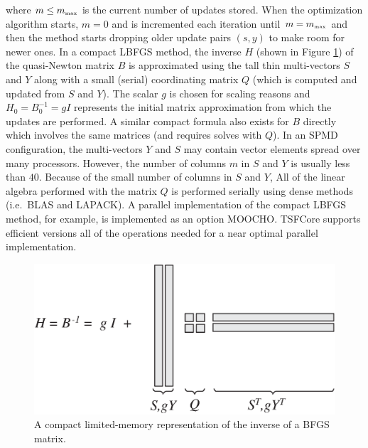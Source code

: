 \documentclass[10pt,fleqn]{article}
\begin{document}
where $m \le m_{\tiny\mbox{max}}$ is the current number of updates
stored.  When the optimization algorithm starts, $m=0$ and is
incremented each iteration until $m = m_{\tiny\mbox{max}}$ and then
the method starts dropping older update pairs $(s,y)$ to make room for
newer ones.  In a compact LBFGS method, the inverse $H$ (shown in
Figure \ref{tsfcore:fig:LBFGS}) of the quasi-Newton matrix $B$ is
approximated using the tall thin multi-vectors $S$ and $Y$ along with
a small (serial) coordinating matrix $Q$ (which is computed and
updated from $S$ and $Y$).  The scalar $g$ is chosen for scaling
reasons and $H_0 = B_0^{-1} = g I$ represents the initial matrix
approximation from which the updates are performed.  A similar compact
formula also exists for $B$ directly which involves the same matrices
(and requires solves with $Q$).  In an SPMD configuration, the
multi-vectors $Y$ and $S$ may contain vector elements spread over many
processors.  However, the number of columns $m$ in $S$ and $Y$ is
usually less than $40$.  Because of the small number of columns in $S$
and $Y$, All of the linear algebra performed with the matrix $Q$ is
performed serially using dense methods (i.e.~BLAS and LAPACK).  A
parallel implementation of the compact LBFGS method, for example, is
implemented as an option MOOCHO.  TSFCore supports efficient versions all
of the operations needed for a near optimal parallel implementation.

{\bsinglespace
\begin{figure}[t]
\begin{center}
\includegraphics*[bb= 0.0in 0.0in 7.0in 3.7in,angle=0,scale=0.60
]{LBFGS}
\end{center}
\caption{
\label{tsfcore:fig:LBFGS}
A compact limited-memory representation of the inverse of a BFGS matrix.
}
\end{figure}
\esinglespace}
\end{document}
